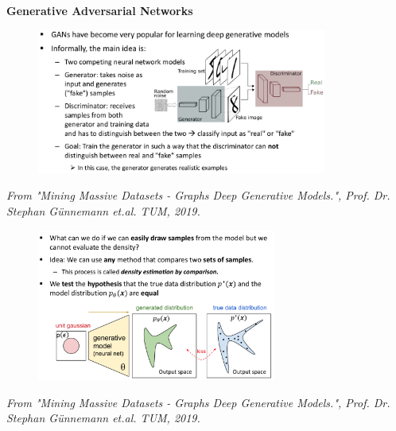 \documentclass{tum-presentation}
\begin{document}
\begin{frame}[c]
	\centering
	\begin{center}
		\Huge\textbf{Generative Adversarial Networks}
	\end{center}
\end{frame}

\begin{frame}
	\begin{figure}
		\centering
		\includegraphics[width=0.85\textwidth,keepaspectratio=true]{tum-resources/images/gan_1.png}
		\label{fig:gan_1}
	\end{figure}
\begin{flushright}
\textit{	From "Mining Massive Datasets - Graphs Deep Generative Models.", Prof. Dr. Stephan Günnemann et.al. TUM, 2019. }
\end{flushright}
\end{frame}

\begin{frame}
	\begin{figure}
		\includegraphics[width=0.70\textwidth,keepaspectratio=true]{tum-resources/images/gan_2.png}
		\label{fig:gan_2}
	\end{figure}
\begin{flushright}
	\textit{	From "Mining Massive Datasets - Graphs Deep Generative Models.", Prof. Dr. Stephan Günnemann et.al. TUM, 2019. }
\end{flushright}
\end{frame}
\end{document}
